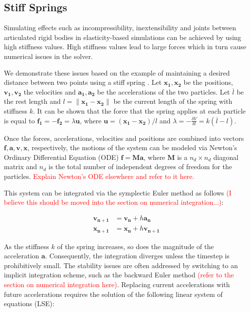\subsection{Stiff Springs}\label{ss:stiff-springs}
Simulating effects such as incompressibility, inextensibility and joints between articulated rigid bodies 
in elasticity-based simulations can be achieved by using high stiffness values. High stiffness values lead to 
large forces which in turn cause numerical issues in the solver. 

We demonstrate these issues based on the example of maintaining a desired distance between two points using a stiff 
spring \cite{tournier2015}. Let $\bm{x_1, x_2}$ be the positions, $\bm{v_1, v_2}$ the velocities and $\bm{a_1, a_2}$
be the accelerations of the two particles. Let $\overline{l}$ be the rest length and $l = \lVert \bm{x_1} - \bm{x_2} \rVert$ 
be the current length of the spring with stiffness $k$. It can be shown that the force that the spring applies at each particle
is equal to $\bm{f_1} = -\bm{f_2} = \lambda\bm{u}$, where $\bm{u} = (\bm{x_1} - \bm{x_2}) / l$
and $\lambda = -\frac{\delta V}{\delta l} = k(\overline{l} - l)$. 

Once the forces, accelerations, velocities and positions are combined into vectors $\bm{f}, \bm{a}, \bm{v}, \bm{x}$, 
respectively, the motions of the system can be modeled via Newton's Ordinary Differential Equation (ODE) $\bm{f} = \bm{Ma}$,
where $\bm{M}$ is a $n_d \times n_d$ diagonal matrix and $n_d$ is the total number of independent degrees of freedom for the 
particles. \textcolor{red}{Explain Newton's ODE elsewhere and refer to it here.}

This system can be integrated via the symplectic Euler method as follows \textcolor{red}{(I believe this should be moved into
the section on numerical integration...)}:

\begin{align*}
    \bm{v_{n+1}} &= \bm{v_n} + h\bm{a_n} \\
    \bm{x_{n+1}} &= \bm{x_n} + h\bm{v_{n+1}}
\end{align*}

As the stiffness $k$ of the spring increases, so does the magnitude of the acceleration $\bm{a}$. Consequently, the integration
diverges unless the timestep is prohibitively small. The stability issues are often addressed by switching to an implicit 
integration scheme, such as the backward Euler method \cite{baraff1998} \textcolor{red}{(refer to the section on numerical 
integration here)}. Replacing current accelerations with future accelerations requires the solution of the following linear 
system of equations (LSE):

